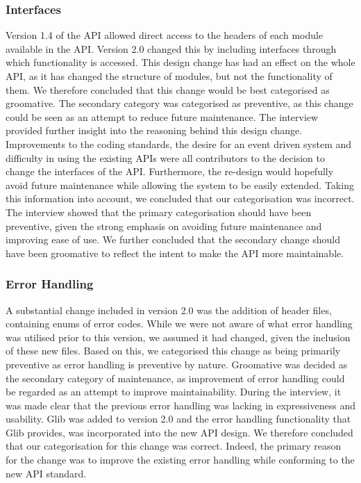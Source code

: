 \documentclass{sig-alternate}
\begin{document}

\subsubsection{Interfaces}

Version 1.4 of the API allowed direct access to the headers of each module available in the API. Version 2.0 changed this by including interfaces through which functionality is accessed. This design change has had an effect on the whole API, as it has changed the structure of modules, but not the functionality of them.
We therefore concluded that this change would be best categorised as  groomative. The secondary category was categorised as preventive, as this change could be seen as an attempt to reduce future maintenance. 
The interview provided further insight into the reasoning behind this design change. Improvements to the coding standards, the desire for an event driven system and difficulty in using the existing APIs were all contributors to the decision to change the interfaces of the API. Furthermore, the re-design would hopefully avoid future maintenance while allowing the system to be easily extended. 
Taking this information into account, we concluded that our categorisation was incorrect. The interview showed that the primary categorisation should have been preventive, given the strong emphasis on avoiding future maintenance and improving ease of use. We further concluded that the secondary change should have been groomative to reflect the intent to make the API more maintainable.


\subsubsection{Error Handling}

A substantial change included in version 2.0 was the addition of header files, containing enums of error codes. While we were not aware of what error handling was utilised prior to this version, we assumed it had changed, given the inclusion of these new files.
Based on this, we categorised this change as being primarily preventive as error handling is preventive by nature. Groomative was decided as the secondary category of maintenance, as improvement of error handling could be regarded as an attempt to improve maintainability. 
During the interview, it was made clear that the previous error handling was lacking in expressiveness and usability. Glib was added to version 2.0 and the error handling functionality that Glib provides, was incorporated into the new API design.
We therefore concluded that our categorisation for this change was correct. Indeed, the primary reason for the change was to improve the existing error handling while conforming to the new API standard. 
\end{document}
